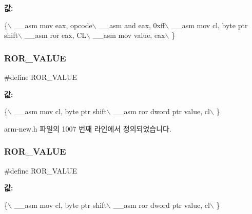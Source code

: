 {\bfseries 값\+:}
\begin{DoxyCode}
\{\(\backslash\)
        \_\_asm mov eax, opcode\(\backslash\)
        \_\_asm and eax, 0xff\(\backslash\)
        \_\_asm mov cl, byte ptr shift\(\backslash\)
        \_\_asm ror eax, CL\(\backslash\)
        \_\_asm mov value, eax\(\backslash\)
      \}
\end{DoxyCode}
\mbox{\label{arm-new_8h_a793652c0fd08b66a203230f71b928fb8}} 
\subsubsection{\texorpdfstring{R\+O\+R\+\_\+\+V\+A\+L\+UE}{ROR\_VALUE}\hspace{0.1cm}{\footnotesize\ttfamily [1/2]}}
{\footnotesize\ttfamily \#define R\+O\+R\+\_\+\+V\+A\+L\+UE}

{\bfseries 값\+:}
\begin{DoxyCode}
\{\(\backslash\)
        \_\_asm mov cl, byte ptr shift\(\backslash\)
        \_\_asm ror dword ptr value, cl\(\backslash\)
      \}
\end{DoxyCode}


arm-\/new.\+h 파일의 1007 번째 라인에서 정의되었습니다.

\mbox{\label{_g_b_a_8cpp_a793652c0fd08b66a203230f71b928fb8}} 
\subsubsection{\texorpdfstring{R\+O\+R\+\_\+\+V\+A\+L\+UE}{ROR\_VALUE}\hspace{0.1cm}{\footnotesize\ttfamily [2/2]}}
{\footnotesize\ttfamily \#define R\+O\+R\+\_\+\+V\+A\+L\+UE}

{\bfseries 값\+:}
\begin{DoxyCode}
\{\(\backslash\)
        \_\_asm mov cl, byte ptr shift\(\backslash\)
        \_\_asm ror dword ptr value, cl\(\backslash\)
      \}
\end{DoxyCode}
\mbox{\label{arm-new_8h_a4e029c81c1b7f6a28d49485aff8d74b8}} 
